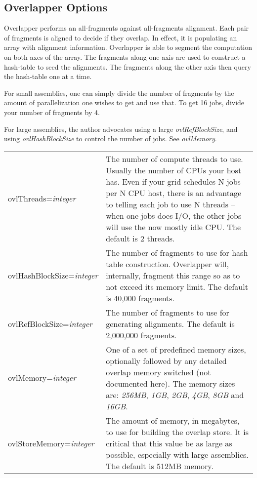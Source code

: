 \documentclass[twoside,11pt]{article}
\begin{document}
\subsection{Overlapper Options}
\label{sec:overlapopt}

Overlapper performs an all-fragments against all-fragments alignment.
Each pair of fragments is aligned to decide if they overlap.  In
effect, it is populating an array with alignment information.
Overlapper is able to segment the computation on both axes of the
array.  The fragments along one axis are used to construct a
hash-table to seed the alignments.  The fragments along the other axis
then query the hash-table one at a time.

For small assemblies, one can simply divide the number of fragments by
the amount of parallelization one wishes to get and use that.  To get
16 jobs, divide your number of fragments by 4.

For large assemblies, the author advocates using a large {\it
ovlRefBlockSize}, and using {\it ovlHashBlockSize} to control the number of
jobs.  See {\it ovlMemory}.

\begin{longtable}{lp{3.0in}}
ovlThreads={\it integer} &
The number of compute threads to use.  Usually the number of CPUs your
host has.  Even if your grid schedules N jobs per N CPU host, there is
an advantage to telling each job to use N threads -- when one jobs
does I/O, the other jobs will use the now mostly idle CPU.  The default is 2 threads.
\\

ovlHashBlockSize={\it integer} &
The number of fragments to use for hash table construction.
Overlapper will, internally, fragment this range so as to not exceed
its memory limit.  The default is 40,000 fragments.
\\

ovlRefBlockSize={\it integer} &
The number of fragments to use for generating alignments.  The default
is 2,000,000 fragments.
\\

ovlMemory={\it integer} &
One of a set of predefined memory sizes, optionally followed by any
detailed overlap memory switched (not documented here).  The memory sizes are:
{\it 256MB},
{\it 1GB},
{\it 2GB},
{\it 4GB},
{\it 8GB} and
{\it 16GB}.
\\

ovlStoreMemory={\it integer} &
The amount of memory, in megabytes, to use for building the overlap
store.  It is critical that this value be as large as possible,
especially with large assemblies.  The default is 512MB memory.
\\
\end{longtable}
\end{document}
